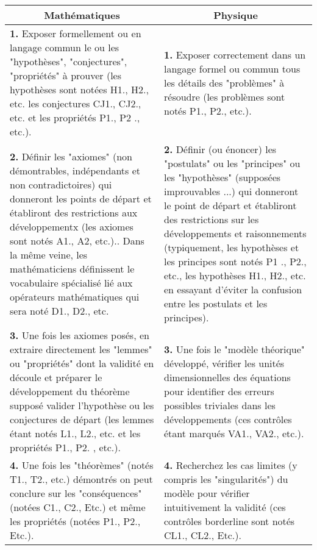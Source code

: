 	\begin{table}[H]
	\begin{center}
			\begin{tabular}{|p{7.5cm}|p{7.5cm}|}
				\hline
				\multicolumn{1}{c}{\cellcolor{black!30}\textbf{Mathématiques}} & 
  \multicolumn{1}{c}{\cellcolor{black!30}\textbf{Physique}} \\ \hline
				\textbf{1.} Exposer formellement ou en langage commun le ou les "hypothèses", "conjectures", "propriétés" à prouver (les hypothèses sont notées H1., H2., etc. les conjectures CJ1., CJ2., etc. et les propriétés P1., P2 ., etc.). & \textbf {1.} Exposer correctement dans un langage formel ou commun tous les détails des "problèmes" à résoudre (les problèmes sont notés P1., P2., etc.). \\ \hline
				\textbf{2.} Définir les "axiomes" (non démontrables, indépendants et non contradictoires) qui donneront les points de départ et établiront des restrictions aux développementx (les axiomes sont notés A1., A2, etc.).\footnotemark. \newline\newline
Dans la même veine, les mathématiciens définissent le vocabulaire spécialisé lié aux opérateurs mathématiques qui sera noté D1., D2., etc. & \textbf{2.} Définir (ou énoncer) les "postulats" ou les "principes" ou les "hypothèses" (supposées improuvables ...) qui donneront le point de départ et établiront des restrictions sur les développements et raisonnements (typiquement, les hypothèses et les principes sont notés P1 ., P2., etc., les hypothèses H1., H2., etc. en essayant d'éviter la confusion entre les postulats et les principes)\footnotemark. \\ \hline
				\textbf{3.} Une fois les axiomes posés, en extraire directement les "lemmes" ou "propriétés" dont la validité en découle et préparer le développement du théorème supposé valider l'hypothèse  ou les conjectures de départ (les lemmes étant notés L1., L2., etc. et les  propriétés P1., P2. , etc.). & \textbf{3.} Une fois le "modèle théorique" développé, vérifier les unités dimensionnelles des équations pour identifier des erreurs possibles triviales dans les développements (ces contrôles étant marqués VA1., VA2., etc.).\\ \hline
				\textbf{4.} Une fois les "théorèmes" (notés T1., T2., etc.) démontrés on peut conclure sur les "conséquences" (notées C1., C2., Etc.) et même les propriétés (notées P1., P2., Etc.). & \textbf{4.} Recherchez les cas limites (y compris les "singularités") du modèle pour vérifier intuitivement la validité (ces contrôles borderline sont notés CL1., CL2., Etc.).\\ \hline

\end{tabular}
\end{center}
\end{table}
